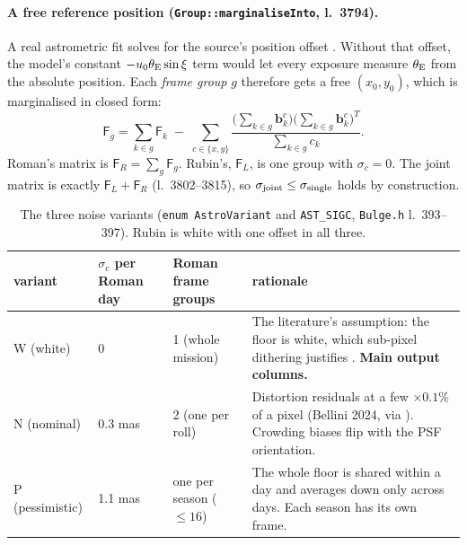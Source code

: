 \documentclass[english,10pt,a4paper]{article}
\newcommand{\tetE}{\theta_{\rm E}}
\newcommand{\code}[1]{\texttt{#1}}
\begin{document}
\paragraph{A free reference position (\code{Group::marginaliseInto}, l.~3794).}
A real astrometric fit solves for the source's position offset
\citep{Lam2026BHbinaries,McKinnon2026RomanGaia}. Without that offset, the model's constant
$-u_0\tetE\sin\xi$ term would let every exposure measure $\tetE$ from the absolute position.
Each \emph{frame group} $g$ therefore gets a free $(x_0,y_0)$, which is marginalised in closed form:
\begin{equation}
\mathsf F_g = \sum_{k\in g}\mathsf F_k \;-\; \sum_{c\in\{x,y\}}
\frac{\big(\sum_{k\in g}\boldsymbol b^{c}_k\big)\big(\sum_{k\in g}\boldsymbol b^{c}_k\big)^{T}}{\sum_{k\in g}c_k}.
\end{equation}
Roman's matrix is $\mathsf F_R=\sum_g\mathsf F_g$. Rubin's, $\mathsf F_L$, is one group with
$\sigma_c=0$. The joint matrix is exactly $\mathsf F_L+\mathsf F_R$ (l.~3802--3815), so
$\sigma_{\rm joint}\le\sigma_{\rm single}$ holds by construction.

\begin{table}[h]
\centering
\caption{The three noise variants (\code{enum AstroVariant} and \code{AST\_SIGC}, \code{Bulge.h}
l.~393--397). Rubin is white with one offset in all three.}
\label{tab:variants}
\small
\begin{tabularx}{\textwidth}{@{}l l l X@{}}
\toprule
variant & $\sigma_c$ per Roman day & Roman frame groups & rationale \\
\midrule
W (white)       & 0             & 1 (whole mission)        & The literature's assumption: the floor is white, which sub-pixel dithering justifies \citep{Lam2026BHbinaries,Sanderson2019WFIRSTastrometry}. \textbf{Main output columns.} \\
N (nominal)     & 0.3 mas       & 2 (one per roll)         & Distortion residuals at a few $\times0.1\%$ of a pixel (Bellini 2024, via \citealt{Lam2026BHbinaries}). Crowding biases flip with the PSF orientation. \\
P (pessimistic) & 1.1 mas       & one per season ($\le16$) & The whole floor is shared within a day and averages down only across days. Each season has its own frame. \\
\bottomrule
\end{tabularx}
\end{table}
\end{document}
